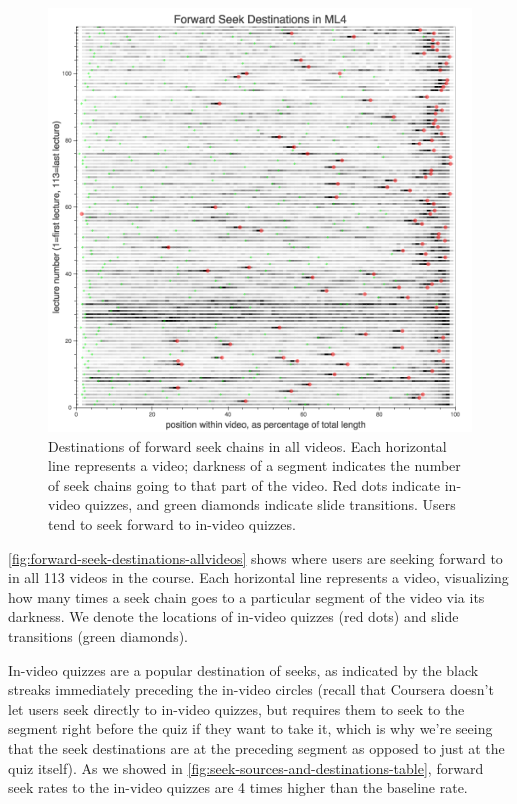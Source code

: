 \documentclass{sigchi}
\begin{document}
\begin{figure}
\includegraphics[width=1.0\columnwidth]{forward-seek-destinations-allvideos}
\caption{Destinations of forward seek chains in all videos. Each horizontal line represents a video; darkness of a segment indicates the number of seek chains going to that part of the video. Red dots indicate in-video quizzes, and green diamonds indicate slide transitions. Users tend to seek forward to in-video quizzes.}
\label{fig:forward-seek-destinations-allvideos}
\end{figure}

\autoref{fig:forward-seek-destinations-allvideos} shows where users are seeking forward to in all 113 videos in the course. Each horizontal line represents a video, visualizing how many times a seek chain goes to a particular segment of the video via its darkness. We denote the locations of in-video quizzes (red dots) and slide transitions (green diamonds).

In-video quizzes are a popular destination of seeks, as indicated by the black streaks immediately preceding the in-video circles (recall that Coursera doesn't let users seek directly to in-video quizzes, but requires them to seek to the segment right before the quiz if they want to take it, which is why we're seeing that the seek destinations are at the preceding segment as opposed to just at the quiz itself). As we showed in \autoref{fig:seek-sources-and-destinations-table}, forward seek rates to the in-video quizzes are 4 times higher than the baseline rate.
\end{document}

